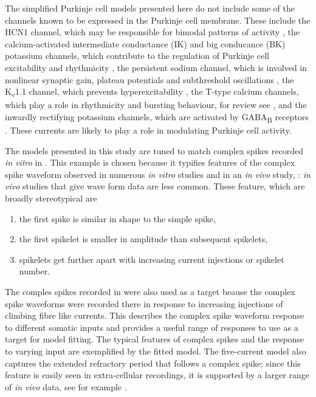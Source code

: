 \documentclass[utf8]{frontiersSCNS} %
\begin{document}
The simplified Purkinje cell models presented here do not include some
of the channels known to be expressed in the Purkinje cell
membrane. These include the HCN1 channel, which may be responsible for
bimodal patterns of activity \cite{LoewensteinEtAl2005}, the
calcium-activated intermediate conductance (IK) and big conducance
(BK) potassium channels, which contribute to the regulation of
Purkinje cell excitability and rhythmicity \cite{CheronEtAl2009}, the
persistent sodium channel, which is involved in nonlinear synaptic
gain, plateau potentials and subthreshold oscillations
\cite{KayEtAl1998}, the K\textsubscript{v}1.1 channel, which prevents
hyperexcitability \cite{ZhangEtAl1999}, the T-type calcium channels,
which play a role in rhythmicity and bursting behaviour, for review
see \cite{CainSnutch2010}, and the inwardly rectifying potassium
channels, which are activated by GABA\textsubscript{B} receptors
\cite{TabataEtAl2005}. These currents are likely to play a role in
modulating Purkinje cell activity.




The models presented in this study are tuned to match complex spikes
recorded \textsl{in vitro} in \cite{DavieEtAl2008}. This example is
chosen because it typifies features of the complex spike
waveform observed in numerous \textsl{in vitro} studies
\cite{ZaghaEtAl2008, zhang2017ethanol, MonsivaisEtAl2005,
  khaliq2005axonal} and in an \textsl{in vivo} study, \cite{WarnaarEtAl2015}:
\textsl{in vivo} studies that give wave form data are less common. These feature, which are broadly
stereotypical are
\begin{enumerate}
\item the first spike is similar in shape to the simple spike,
\item the first spikelet is smaller in amplitude than subsequent spikelets,
\item spikelets get further apart with increasing current injections or spikelet number.
\end{enumerate}
The comples spikes recorded in \cite{DavieEtAl2008} were also used as
a target beause the complex spike waveforms were recorded there in
response to increasing injections of climbing fibre like
currents. This describes the complex spike waveform response to
different somatic inputs and provides a useful range of responses to
use as a target for model fitting. The typical features of complex
spikes and the response to varying input are exemplified by the fitted
model. The five-current model also captures the extended refractory
period that follows a complex spike; since this feature is easily seen
in extra-cellular recordings, it is supported by a larger range of
\textsl{in vivo} data, see for example \cite{GranitPhillips1956,LathamPaul1970,BloedelRoberts1971,ArmstrongRawson1979,BausweinEtAl1983,SatoEtAl1992, BurroughsEtAl2016}.
\end{document}
